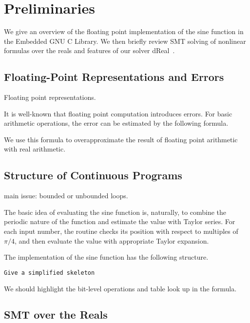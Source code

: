 \section{Preliminaries}

We give an overview of the floating point implementation of the sine function in the Embedded GNU C Library. We then briefly review SMT solving of nonlinear formulas over the reals and features of our solver dReal~\cite{}.

\subsection{Floating-Point Representations and Errors}

Floating point representations. 

It is well-known that floating point computation introduces errors. For basic arithmetic operations, the error can be estimated by the following formula. 

We use this formula to overapproximate the result of floating point arithmetic with real arithmetic. 

\subsection{Structure of Continuous Programs}

main issue: bounded or unbounded loops. 

The basic idea of evaluating the sine function is, naturally, to combine the periodic nature of the function and estimate the value with Taylor series. For each input number, the routine checks its position with respect to multiples of $\pi/4$, and then evaluate the value with appropriate Taylor expansion. 

The implementation of the sine function has the following structure. 
\begin{verbatim}
Give a simplified skeleton
\end{verbatim}

We should highlight the bit-level operations and table look up in the formula. 

\subsection{SMT over the Reals}


